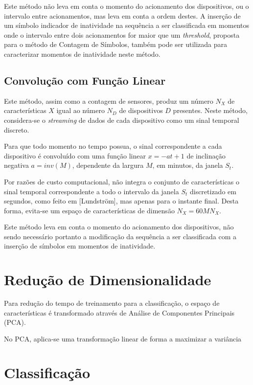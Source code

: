\documentclass[
	12pt,				%
	openright,			%
	twoside,			%
	a4paper,			%
	english,			%
	spanish,			%
	brazil,				%
	]{abntex2}\usepackage[]{graphicx}\usepackage[]{color}
\begin{document}
Este método não leva em conta o momento do acionamento dos dispositivos, ou o intervalo entre acionamentos, mas leva em conta a ordem destes. A inserção de um símbolo indicador de inatividade na sequência a ser classificada em momentos onde o intervalo entre dois acionamentos for maior que um \textit{threshold}, proposta para o método de Contagem de Símbolos, também pode ser utilizada para caracterizar momentos de inatividade neste método.

\subsection{Convolução com Função Linear}

Este método, assim como a contagem de sensores, produz um número $N_X$ de características $X$ igual ao número $N_D$ de dispositivos $D$ presentes. Neste método, considera-se o \textit{streaming} de dados de cada dispositivo como um sinal temporal discreto.

Para que todo momento no tempo possua, o sinal correspondente a cada dispositivo é convoluído com uma função linear $x = -at+1$ de inclinação negativa $a = inv(M)$, dependente da largura $M$, em minutos, da janela $S_t$.

Por razões de custo computacional, não integra o conjunto de características o sinal temporal correspondente a todo o intervalo da janela $S_t$ discretizado em segundos, como feito em [Lundström], mas apenas para o instante final. Desta forma, evita-se um espaço de características de dimensão $N_X = 60 M N_X$.

Este método leva em conta o momento do acionamento dos dispositivos, não sendo necessário portanto a modificação da sequência a ser classificada com a inserção de símbolos em momentos de inatividade.

\section{Redução de Dimensionalidade}

Para redução do tempo de treinamento para a classificação, o espaço de características é transformado através de Análise de Componentes Principais (PCA).

No PCA, aplica-se uma transformação linear de forma a maximizar a variância

\section{Classificação}
\end{document}
